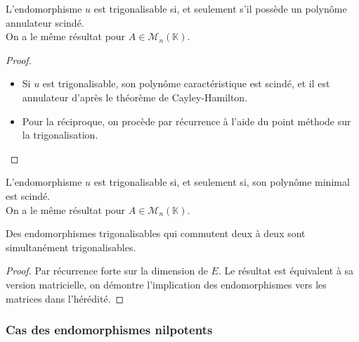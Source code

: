 \documentclass[french]{article}
\newcommand{\K}{\mathbb{K}}
\theoremstyle{plain}
\theoremstyle{definition}
\theoremstyle{remark}
\begin{document}
	\begin{thm}%
		L'endomorphisme $u$ est trigonalisable si, et seulement s'il possède un polynôme annulateur scindé.\\
		On a le même résultat pour $A\in\mathcal{M}_n(\K)$.
	\end{thm}
	\begin{proof}
		\begin{itemize}
			\item Si $u$ est trigonalisable, son polynôme caractéristique est scindé, et il est annulateur d'après le théorème de Cayley-Hamilton.
			\item Pour la réciproque, on procède par récurrence à l'aide du point méthode sur la trigonalisation.
		\end{itemize}
	\end{proof}
	
	\begin{cor}%
		L'endomorphisme $u$ est trigonalisable si, et seulement si, son polynôme minimal est scindé.\\
		On a le même résultat pour $A\in\mathcal{M}_n(\K)$.
	\end{cor}
	
	\begin{thm}%
		Des endomorphismes trigonalisables qui commutent deux à deux sont simultanément trigonalisables.
	\end{thm}
	\begin{proof}
		Par récurrence forte sur la dimension de $E$. Le résultat est équivalent à sa version matricielle, on démontre l'implication des endomorphismes vers les matrices dans l'hérédité.
	\end{proof}
	
	\subsubsection*{Cas des endomorphismes nilpotents}
	
\end{document}

